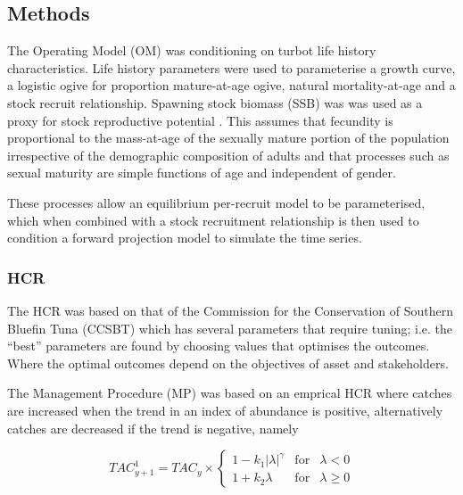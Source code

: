 \documentclass[12pt,doublespacing,a4paper]{ouparticle}
\begin{document}
\subsection{Methods}

The  Operating Model (OM) was conditioning on turbot life history characteristics.  Life history parameters were used to parameterise a \cite{vonbert1957quantitative} growth curve, a logistic ogive for proportion mature-at-age ogive, natural mortality-at-age \citep{lorenzen2002density} and a \cite{beverton1993dynamics} stock recruit relationship. Spawning stock biomass (SSB) was was used as a proxy for stock reproductive potential \citep[SRP][]{trippel_estimation_1999,Trippel 1999,tomkiewicz2003avaliable}. This assumes that fecundity is proportional to the mass-at-age of the sexually mature portion of the population irrespective of the demographic composition of adults \citep{murawski_impacts_2001} and that processes such as sexual maturity are simple functions of age \citep{matsuda_inconsistency_1996} and independent of gender.

These processes allow an equilibrium per-recruit model to be parameterised, which when combined with a stock recruitment relationship \cite{sissenwine1987alternative} is then used to condition a forward projection model to simulate the time series.


\subsubsection{HCR}

The HCR was based on that of the Commission for the Conservation of Southern Bluefin Tuna (CCSBT) which has several parameters that require tuning; i.e. the “best” parameters are found by choosing  values that optimises the outcomes. Where the optimal outcomes depend on the objectives of  asset and stakeholders. 

The Management Procedure (MP) was based on an emprical HCR where catches are increased when the trend in an index of abundance is positive, alternatively catches are decreased if the trend is negative, namely 

\begin{equation}
 TAC^1_{y+1}=TAC_y\times 
 \left\{\begin{array}{rcl}  
    {1-k_1|\lambda|^{\gamma}} & \mbox{for} & \lambda<0\\[0.35cm]
    {1+k_2\lambda} & \mbox{for} & \lambda\geq 0 
 \end{array}\right.
\end{equation}
\end{document}
